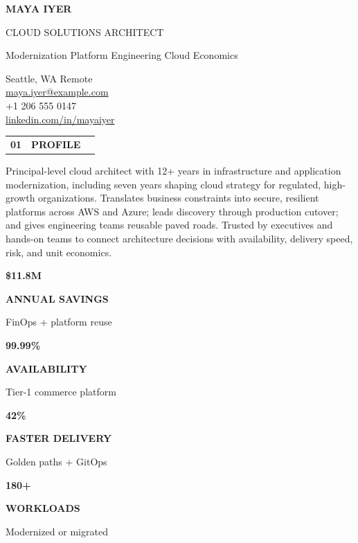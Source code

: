 \documentclass[10pt,a4paper]{article}
\makeatletter
\newcommand{\resumeSection}[2]{%
  \Needspace*{5\baselineskip}%
  \vspace{5pt}%
  \noindent
  \begin{tabularx}{\linewidth}{@{}l@{\hspace{7pt}}l@{\hspace{8pt}}X@{}}
    {\small\bfseries\color{blue}#1} &
    {\large\bfseries\color{navy}#2} &
    \raisebox{0.45ex}{\color{line}\leaders\hrule height 0.7pt\hfill\kern0pt}
  \end{tabularx}%
  \par\vspace{3pt}
}
\newcommand{\metric}[3]{%
  \begin{minipage}[t]{0.225\linewidth}
    \centering
    {\fontsize{18}{20}\selectfont\bfseries\color{navy}#1}\par
    {\scriptsize\bfseries\color{blue}\MakeUppercase{#2}}\par
    {\scriptsize\color{muted}#3}
  \end{minipage}%
}
\makeatother
\begin{document}
\begin{tcolorbox}[
  enhanced,
  colback=navy,
  colframe=navy,
  boxrule=0pt,
  arc=0pt,
  left=15pt,right=15pt,top=11pt,bottom=11pt,
  before skip=0pt,after skip=7pt,
  overlay={\fill[aqua] (frame.south west) rectangle ([yshift=3pt]frame.south east);}
]
  \begin{minipage}[c]{0.62\linewidth}
    {\fontsize{28}{31}\selectfont\bfseries\color{white}MAYA IYER}\par
    \vspace{2pt}
    {\fontsize{14}{17}\selectfont\color{aqua!90!white}CLOUD SOLUTIONS ARCHITECT}\par
    \vspace{6pt}
    {\small\color{white!78}Modernization \textbullet{} Platform Engineering \textbullet{} Cloud Economics}
  \end{minipage}
  \hfill
  \begin{minipage}[c]{0.34\linewidth}
    \raggedleft\small\color{white!88}
    \faMapMarker*\enspace Seattle, WA \textbar{} Remote\\[3pt]
    \faEnvelope\enspace\href{mailto:maya.iyer@example.com}{maya.iyer@example.com}\\[3pt]
    \faPhone\enspace +1 206 555 0147\\[3pt]
    \faLinkedin\enspace\href{https://www.linkedin.com/in/mayaiyer}{linkedin.com/in/mayaiyer}
  \end{minipage}
\end{tcolorbox}

\fontsize{9.25}{11.05}\selectfont

\resumeSection{01}{PROFILE}
Principal-level cloud architect with 12+ years in infrastructure and application modernization, including seven years shaping cloud strategy for regulated, high-growth organizations. Translates business constraints into secure, resilient platforms across AWS and Azure; leads discovery through production cutover; and gives engineering teams reusable paved roads. Trusted by executives and hands-on teams to connect architecture decisions with availability, delivery speed, risk, and unit economics.

\vspace{3pt}
\begin{tcolorbox}[
  colback=white,colframe=line,boxrule=0.6pt,arc=2pt,
  left=5pt,right=5pt,top=5pt,bottom=5pt,
  before skip=0pt,after skip=2pt
]
  \metric{\$11.8M}{Annual savings}{FinOps + platform reuse}
  \hfill
  \metric{99.99\%}{Availability}{Tier-1 commerce platform}
  \hfill
  \metric{42\%}{Faster delivery}{Golden paths + GitOps}
  \hfill
  \metric{180+}{Workloads}{Modernized or migrated}
\end{tcolorbox}
\end{document}
